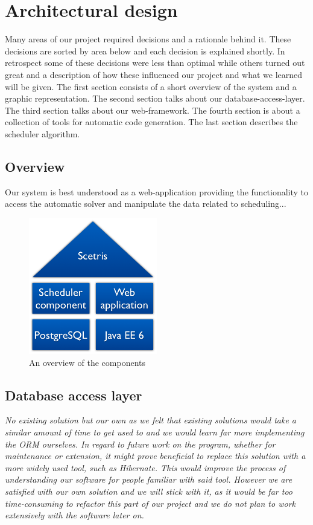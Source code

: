 
\section{Architectural design}

Many areas of our project required decisions and a rationale behind it. These decisions are sorted by area below and each decision is explained shortly. In retrospect some of these decisions were less than optimal while others turned out great and a description of how these influenced our project and what we learned will be given. The first section consists of a short overview of the system and a graphic representation. The second section talks about our database-access-layer. The third section talks about our web-framework. The fourth section is about a collection of tools for automatic code generation. The last section describes the scheduler algorithm.

\subsection{Overview}
Our system is best understood as a web-application providing the functionality to access the automatic solver and manipulate the data related to scheduling... 

\begin{figure}[H]
	\centering
		\includegraphics[width=0.5\textwidth]{images/scetris-house.png}
	\caption{\small An overview of the components}
	\label{fig:scetris-house}
\end{figure}

\subsection{Database access layer}

\emph{No existing solution but our own as we felt that existing solutions would take a similar amount of time to get used to and we would learn far more implementing the ORM ourselves. In regard to future work on the program, whether for maintenance or extension, it might prove beneficial to replace this solution with a more widely used tool, such as Hibernate. This would improve the process of understanding our software for people familiar with said tool. However we are satisfied with our own solution and we will stick with it, as it would be far too time-consuming to refactor this part of our project and we do not plan to work extensively with the software later on.}




